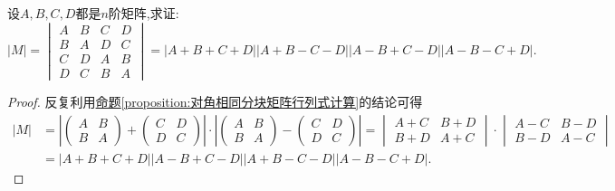 \documentclass[../../main.tex]{subfiles}%
\begin{document}
\begin{example}
设\(A,B,C,D\)都是\(n\)阶矩阵,求证:
\[
|M| = 
\begin{vmatrix}
A & B & C & D\\
B & A & D & C\\
C & D & A & B\\
D & C & B & A
\end{vmatrix}
= |A + B + C + D||A + B - C - D||A - B + C - D||A - B - C + D|.
\]
\end{example}
\begin{proof}

反复利用\hyperref[proposition:对角相同分块矩阵行列式计算]{命题\ref{proposition:对角相同分块矩阵行列式计算}}的结论可得
\begin{align*}
|M|&=\left|\begin{pmatrix}
A & B\\
B & A
\end{pmatrix}+\begin{pmatrix}
C & D\\
D & C
\end{pmatrix}\right|\cdot\left|\begin{pmatrix}
A & B\\
B & A
\end{pmatrix}-\begin{pmatrix}
C & D\\
D & C
\end{pmatrix}\right|
=\begin{vmatrix}
A + C & B + D\\
B + D & A + C
\end{vmatrix}\cdot\begin{vmatrix}
A - C & B - D\\
B - D & A - C
\end{vmatrix}\\
&=|A + B + C + D||A - B + C - D||A + B - C - D||A - B - C + D|.
\end{align*}

\end{proof}
\end{document}
